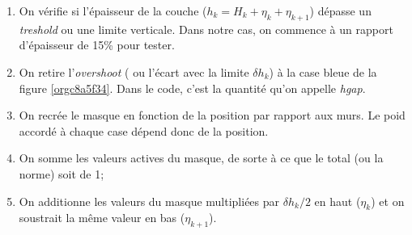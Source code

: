 \documentclass[10pt]{article}
\numberwithin{equation}{section}
\begin{document}
\begin{enumerate}
\item On vérifie si l'épaisseur de la couche (\(h_k = H_k + \eta_k + \eta_{k+1}\)) dépasse un \emph{treshold} ou une limite verticale.
Dans notre cas, on commence à un rapport d'épaisseur de 15\% pour tester.
\item On retire l'\emph{overshoot} ( ou l'écart avec la limite \(\delta h_k\)) à la case bleue de la figure \ref{orgc8a5f34}.
Dans le code, c'est la quantité qu'on appelle \emph{hgap}.
\item On recrée le masque en fonction de la position par rapport aux murs.
Le poid accordé à chaque case dépend donc de la position.
\item On somme les valeurs actives du masque, de sorte à ce que le total (ou la norme) soit de 1;
\item On additionne les valeurs du masque multipliées par \(\delta h_k/2\) en haut (\(\eta_k\)) et on soustrait la même valeur en bas (\(\eta_{k+1}\)).
\end{enumerate}
\end{document}
